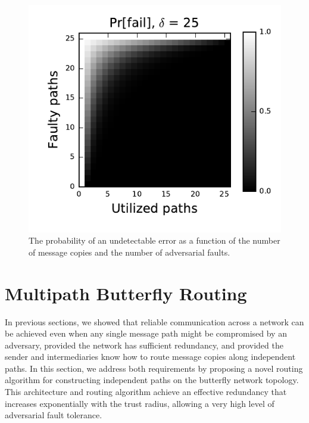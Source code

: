 \documentclass[twocolumn]{article}
\begin{document}
\begin{figure}
\centerline{\includegraphics{fig-perror}}
\caption{
The probability of an undetectable error as a function of the number of
message copies and the number of adversarial faults.
}
\label{fig:pfail}
\end{figure}

\section{Multipath Butterfly Routing}
\label{sec-butterfly}

In previous sections, we showed that reliable communication across a network
can be achieved even when any single message path might be compromised by
an adversary,
provided the network has sufficient redundancy,
and provided the sender and intermediaries know how to route message
copies along independent paths.
In this section, we address both requirements by proposing a novel routing
algorithm for constructing independent paths on the butterfly network topology.
This architecture and routing algorithm achieve an
effective redundancy that increases exponentially with the trust radius,
allowing a very high level of adversarial fault tolerance.
\end{document}
